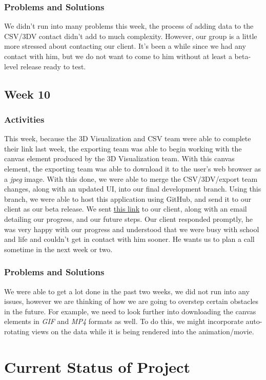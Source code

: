 \documentclass[journal,10pt,onecolumn,compsoc]{IEEEtran} \usepackage[margin=1.0in]{geometry} \usepackage{pdfpages}
\begin{document}
    \subsubsection{Problems and Solutions}
    We didn't run into many problems this week, the process of adding data to the CSV/3DV contact didn't add to much complexity. However, our group is a little more stressed about contacting our client. It's been a while since we had any contact with him, but we do not want to come to him without at least a beta-level release ready to test. 

    \subsection{Week 10}
    \subsubsection{Activities}
    This week, because the 3D Visualization and CSV team were able to complete their link last week, the exporting team was able to begin working with the canvas element produced by the 3D Visualization team. With this canvas element, the exporting team was able to download it to the user's web browser as a \emph{jpeg} image. With this done, we were able to merge the CSV/3DV/export team changes, along with an updated UI, into our final development branch. Using this branch, we were able to host this application using GitHub, and send it to our client as our beta release. We sent \href{https://ryansisco.github.io/DIVA/}{this link} to our client, along with an email detailing our progress, and our future steps. Our client responded promptly, he was very happy with our progress and understood that we were busy with school and life and couldn't get in contact with him sooner. He wants us to plan a call sometime in the next week or two. 
    \subsubsection{Problems and Solutions}
    We were able to get a lot done in the past two weeks, we did not run into any issues, however we are thinking of how we are going to overstep certain obstacles in the future. For example, we need to look further into downloading the canvas elements in \emph{GIF} and \emph{MP4} formats as well. To do this, we might incorporate auto-rotating views on the data while it is being rendered into the animation/movie. 
    
 \section{Current Status of Project}
\end{document}
